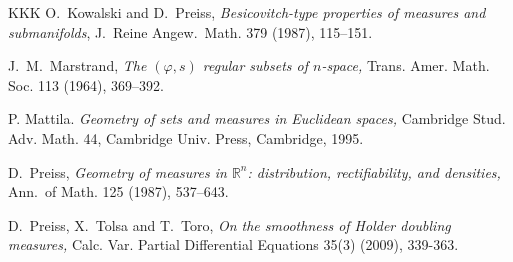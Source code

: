 \documentclass[11pt]{amsart}
\newcommand{\R}{{\mathbb R}}       %
\newcommand{\vphi}{{\varphi}}
\newcommand{\vvv}{\vspace{4mm}}
\theoremstyle{definition}
\theoremstyle{remark}
\numberwithin{equation}{section}
\begin{document}
\begin{thebibliography}{KKK}
 O.\ Kowalski and D.\ Preiss, {\em Besicovitch-type properties of
measures and submanifolds}, J.\ Reine Angew.\ Math. { 379} (1987),
115--151.

 J.\ M.\ Marstrand, {\em The $(\vphi,s)$ regular subsets of $n$-space,} Trans. Amer. Math. Soc. 113 (1964), 369--392.

 P. Mattila. {\em Geometry of sets and measures in
Euclidean spaces,} Cambridge Stud. Adv. Math. 44, Cambridge Univ.
Press, Cambridge, 1995.

 D.\ Preiss, {\em Geometry of measures in $\R^n$: distribution,
rectifiability, and densities,} Ann.\ of Math. {125} (1987),
537--643.

 D.\ Preiss, X.\ Tolsa and T.\ Toro, 
{\em On the smoothness of Holder doubling measures,} Calc. Var. Partial Differential Equations 35(3) (2009), 339-363. 

\end{thebibliography}


\vvv

\end{document}
